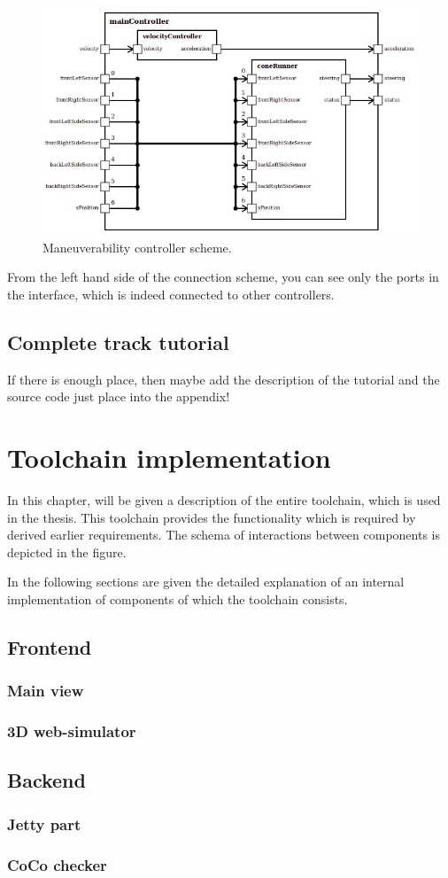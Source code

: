 \begin{figure}[ht]
    \centering
    \includegraphics[width=\linewidth]{src/pic/controller04}
    \caption{Maneuverability controller scheme.}
    \label{fig:maneuverability-scheme}
\end{figure}
From the left hand side of the connection scheme, you can see only the ports in the interface, which is indeed connected to other controllers.
\section{Complete track tutorial}
If there is enough place, then maybe add the description of the tutorial and the source code just place into the appendix! 
\chapter{Toolchain implementation}
In this chapter, will be given a description of the entire toolchain, which is used in the thesis. This toolchain provides the functionality which is required by derived earlier requirements. The schema of interactions between components is depicted in the figure.

In the following sections are given the detailed explanation of an internal implementation of components of which the toolchain consists.
\section{Frontend}
\subsection{Main view}
\subsection{3D web-simulator}
\section{Backend}
\subsection{Jetty part}
\subsection{CoCo checker}
